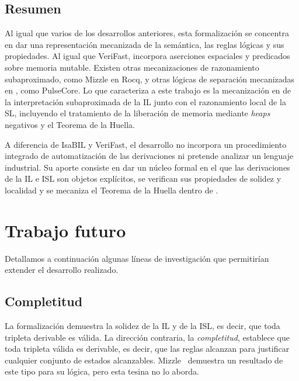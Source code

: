 \documentclass[a4paper,	11pt]{report}
\begin{document}
\subsection*{Resumen}
Al igual que varios de los desarrollos anteriores,
esta formalización se concentra en dar una representación mecanizada de la semántica,
las reglas lógicas y sus propiedades.
Al igual que VeriFast,
incorpora aserciones espaciales y predicados sobre memoria mutable.
Existen otras mecanizaciones de razonamiento subaproximado,
como Mizzle en Rocq,
y otras lógicas de separación mecanizadas en \fstar{},
como PulseCore.
Lo que caracteriza a este trabajo es la mecanización en \fstar{} de la interpretación subaproximada de la IL junto con el razonamiento local de la SL,
incluyendo el tratamiento de la liberación de memoria mediante \emph{heaps} negativos y el Teorema de la Huella.

A diferencia de IsaBIL y VeriFast,
el desarrollo no incorpora un procedimiento integrado de automatización de las derivaciones ni pretende analizar un lenguaje industrial.
Su aporte consiste en dar un núcleo formal en el que las derivaciones de la IL e ISL son objetos explícitos,
se verifican sus propiedades de solidez y localidad y se mecaniza el Teorema de la Huella dentro de \fstar{}.

\section{Trabajo futuro}
\label{sec:futuro}
Detallamos a continuación algunas líneas de investigación que permitirían extender el desarrollo realizado.

\subsection*{Completitud}
La formalización demuestra la solidez de la IL y de la ISL,
es decir,
que toda tripleta derivable es válida.
La dirección contraria,
la \emph{completitud},
establece que toda tripleta válida es derivable,
es decir,
que las reglas alcanzan para justificar cualquier conjunto de estados alcanzables.
Mizzle~\citep{mizzle} demuestra un resultado de este tipo para su lógica,
pero esta tesina no lo aborda.
\end{document}
